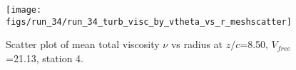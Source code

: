 \begin{figure}[H]
\centering
\texttt{[image: figs/run\_34/run\_34\_turb\_visc\_by\_vtheta\_vs\_r\_meshscatter]}
\caption{Scatter plot of mean total viscosity $\nu$ vs radius at $z/c$=8.50, $V_{free}$=21.13, station 4.}
\label{fig:run_34_turb_visc_by_vtheta_vs_r_meshscatter}
\end{figure}


